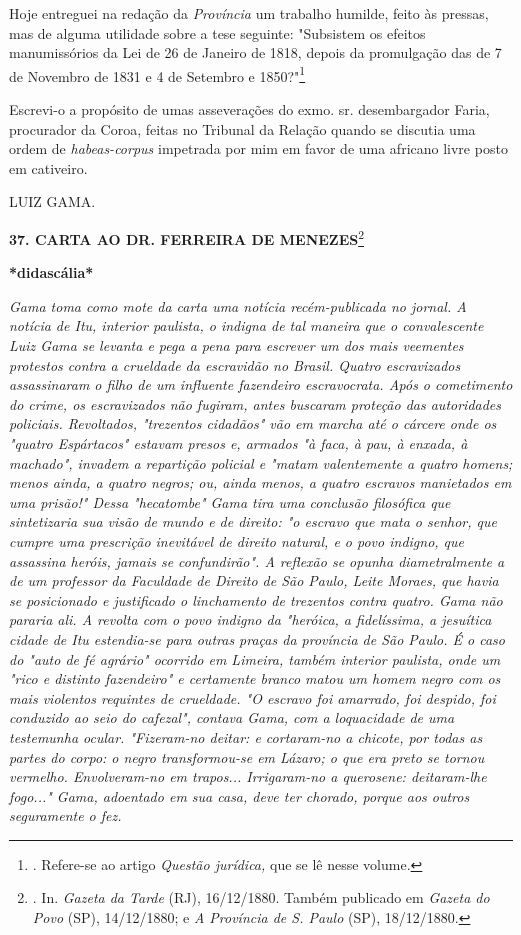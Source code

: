 Hoje entreguei na redação da \emph{Província} um trabalho humilde, feito
às pressas, mas de alguma utilidade sobre a tese seguinte: "Subsistem os
efeitos manumissórios da Lei de 26 de Janeiro de 1818, depois da
promulgação das de 7 de Novembro de 1831 e 4 de Setembro e
1850?"\footnote{. Refere-se ao artigo \emph{Questão jurídica,} que se lê
  nesse volume.}

Escrevi-o a propósito de umas asseverações do exmo. sr. desembargador
Faria, procurador da Coroa, feitas no Tribunal da Relação quando se
discutia uma ordem de \emph{habeas-corpus} impetrada por mim em favor de
uma africano livre posto em cativeiro.

LUIZ GAMA.

\textbf{37. CARTA AO DR. FERREIRA DE MENEZES}\footnote{. In.
  \emph{Gazeta da Tarde} (RJ), 16/12/1880. Também publicado em
  \emph{Gazeta do Povo} (SP), 14/12/1880; e \emph{A Província de S.
  Paulo} (SP), 18/12/1880.}

\textbf{*didascália*}

\emph{Gama toma como mote da carta uma notícia recém-publicada no
jornal. A notícia de Itu, interior paulista, o indigna de tal maneira
que o convalescente Luiz Gama se levanta e pega a pena para escrever um
dos mais veementes protestos contra a crueldade da escravidão no Brasil.
Quatro escravizados assassinaram o filho de um influente fazendeiro
escravocrata. Após o cometimento do crime, os escravizados não fugiram,
antes buscaram proteção das autoridades policiais. Revoltados,
"trezentos cidadãos" vão em marcha até o cárcere onde os "quatro
Espártacos" estavam presos e, armados "à faca, à pau, à enxada, à
machado", invadem a repartição policial e "matam valentemente a quatro
homens; menos ainda, a quatro negros; ou, ainda menos, a quatro escravos
manietados em uma prisão!" Dessa "hecatombe" Gama tira uma conclusão
filosófica que sintetizaria sua visão de mundo e de direito: "o escravo
que mata o senhor, que cumpre uma prescrição inevitável de direito
natural, e o povo indigno, que assassina heróis, jamais se confundirão".
A reflexão se opunha diametralmente a de um professor da Faculdade de
Direito de São Paulo, Leite Moraes, que havia se posicionado e
justificado o linchamento de trezentos contra quatro. Gama não pararia
ali. A revolta com o povo indigno da "heróica, a fidelíssima, a
jesuítica cidade de Itu estendia-se para outras praças da província de
São Paulo. É o caso do "auto de fé agrário" ocorrido em Limeira, também
interior paulista, onde um "rico e distinto fazendeiro" e certamente
branco matou um homem negro com os mais violentos requintes de
crueldade. "O escravo foi amarrado, foi despido, foi conduzido ao seio
do cafezal", contava Gama, com a loquacidade de uma testemunha ocular.
"Fizeram-no deitar: e cortaram-no a chicote, por todas as partes do
corpo: o negro transformou-se em Lázaro; o que era preto se tornou
vermelho. Envolveram-no em trapos... Irrigaram-no a querosene:
deitaram-lhe fogo..." Gama, adoentado em sua casa, deve ter chorado,
porque aos outros seguramente o fez. }

